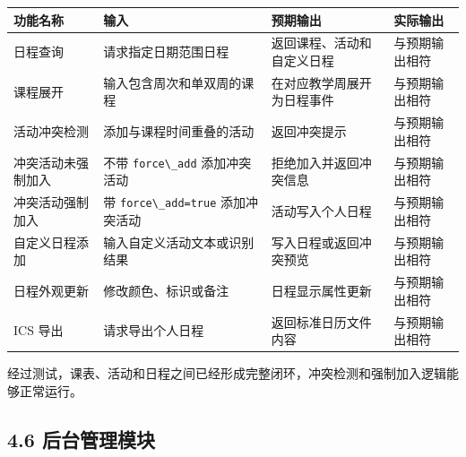 {\def\LTcaptype{none} %
\begin{longtable}[]{@{}|
  >{\raggedright\arraybackslash}p{}|
  >{\raggedright\arraybackslash}p{}|
  >{\raggedright\arraybackslash}p{}|
  >{\raggedright\arraybackslash}p{}|@{}}
\hline
\rowcolor{gray!12}
\begin{minipage}[b]{\linewidth}\raggedright
\bfseries 功能名称
\end{minipage} & \begin{minipage}[b]{\linewidth}\raggedright
\bfseries 输入
\end{minipage} & \begin{minipage}[b]{\linewidth}\raggedright
\bfseries 预期输出
\end{minipage} & \begin{minipage}[b]{\linewidth}\raggedright
\bfseries 实际输出
\end{minipage} \\
\hline
\endhead
\hline
\endlastfoot
日程查询 & 请求指定日期范围日程 & 返回课程、活动和自定义日程 &
与预期输出相符 \\
\hline
课程展开 & 输入包含周次和单双周的课程 & 在对应教学周展开为日程事件 &
与预期输出相符 \\
\hline
活动冲突检测 & 添加与课程时间重叠的活动 & 返回冲突提示 &
与预期输出相符 \\
\hline
冲突活动未强制加入 & 不带 \passthrough{\lstinline!force\_add!}
添加冲突活动 & 拒绝加入并返回冲突信息 & 与预期输出相符 \\
\hline
冲突活动强制加入 & 带 \passthrough{\lstinline!force\_add=true!}
添加冲突活动 & 活动写入个人日程 & 与预期输出相符 \\
\hline
自定义日程添加 & 输入自定义活动文本或识别结果 & 写入日程或返回冲突预览 &
与预期输出相符 \\
\hline
日程外观更新 & 修改颜色、标识或备注 & 日程显示属性更新 &
与预期输出相符 \\
\hline
ICS 导出 & 请求导出个人日程 & 返回标准日历文件内容 & 与预期输出相符 \\
\hline
\end{longtable}
}

经过测试，课表、活动和日程之间已经形成完整闭环，冲突检测和强制加入逻辑能够正常运行。

\subsection{4.6
后台管理模块}\label{ux540eux53f0ux7ba1ux7406ux6a21ux5757}

